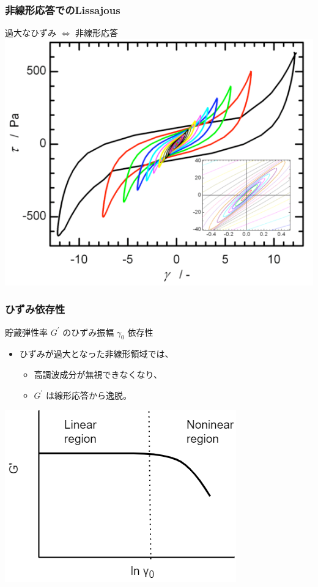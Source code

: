 \documentclass[unicode,12pt]{beamer}%
\begin{document}
\begin{frame}
	\frametitle{非線形応答でのLissajous}
		\begin{alertblock}{過大なひずみ $\Leftrightarrow$ 非線形応答}
			\centering
			\includegraphics[width=.7\textwidth]{nonlinear_liss.png}	
		\end{alertblock}
\end{frame}

\begin{frame}
	\frametitle{ひずみ依存性}
		\begin{block}{貯蔵弾性率 $G^{\prime}$ のひずみ振幅 $\gamma_0$ 依存性}
			\begin{itemize}
				\item ひずみが過大となった非線形領域では、
				\begin{itemize}
					\item 高調波成分が無視できなくなり、 
					\item $G^{\prime}$ は線形応答から逸脱。
				\end{itemize}
			\end{itemize}
			\vspace{2mm}
			\centering
				\includegraphics[width=.55\textwidth]{non-linear.png}
		\end{block}
\end{frame}
\end{document}

